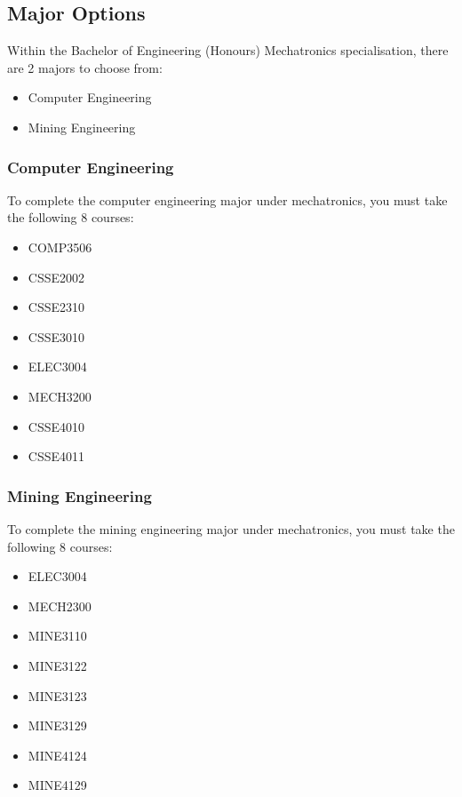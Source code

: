 \documentclass[a4paper,12pt]{report}
\begin{document}
\newpage

\subsection{Major Options}
Within the Bachelor of Engineering (Honours) Mechatronics specialisation, there are 2 majors to choose from:
\begin{itemize}
    \item Computer Engineering
    \item Mining Engineering
\end{itemize}

\subsubsection{Computer Engineering}
To complete the computer engineering major under mechatronics, you must take the following 8 courses:
\begin{multicols}{2}
    \begin{itemize}
        \item COMP3506
        \item CSSE2002
        \item CSSE2310
        \item CSSE3010
        \item ELEC3004
        \item MECH3200
        \item CSSE4010
        \item CSSE4011
    \end{itemize}
\end{multicols}

\subsubsection{Mining Engineering}
To complete the mining engineering major under mechatronics, you must take the following 8 courses:
\begin{multicols}{2}
    \begin{itemize}
        \item ELEC3004
        \item MECH2300
        \item MINE3110
        \item MINE3122
        \item MINE3123
        \item MINE3129
        \item MINE4124
        \item MINE4129
    \end{itemize}
\end{multicols}
\end{document}
